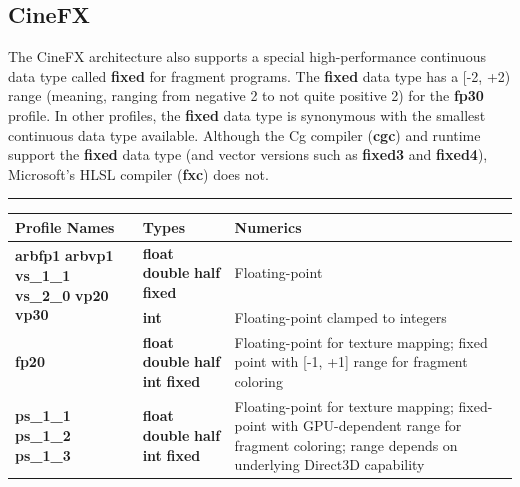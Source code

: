 \documentclass{book}
\begin{document}
\subsection*{CineFX}

The CineFX architecture also supports a special high-performance continuous data type called \textbf{fixed} for fragment programs. The \textbf{fixed} data type has a [-2, +2) range (meaning, ranging from negative 2 to not quite positive 2) for the \textbf{fp30} profile. In other profiles, the \textbf{fixed} data type is synonymous with the smallest continuous data type available. Although the Cg compiler (\textbf{cgc}) and runtime support the \textbf{fixed} data type (and vector versions such as \textbf{fixed3} and \textbf{fixed4}), Microsoft's HLSL compiler (\textbf{fxc}) does not.
\hrule

\begin{table}
\centering
\begin{tabular}{ p{2cm} p{2cm} p{7cm}  } 

Profile Names & Types & Numerics \\
\hline

\multirow{2}{4em}{\textbf{arbfp1} \newline \textbf{arbvp1} \newline \textbf{vs_1_1} \newline \textbf{vs_2_0} \newline \textbf{vp20} \newline \textbf{vp30} } & \textbf{float} \newline \textbf{double} \newline \textbf{half} \newline \textbf{fixed} & Floating-point \\
\cline{2-3}
& \textbf{int} \newline & Floating-point clamped to integers \\
\hline

\textbf{fp20} & \textbf{float} \newline \textbf{double} \newline \textbf{half} \newline \textbf{int} \newline \textbf{fixed} & Floating-point for texture mapping; fixed point with [-1, +1] range for fragment coloring \\
\hline

\textbf{ps_1_1} \newline \textbf{ps_1_2} \newline \textbf{ps_1_3} & \textbf{float} \newline \textbf{double} \newline \textbf{half} \newline \textbf{int} \newline \textbf{fixed} & Floating-point for texture mapping; fixed-point with GPU-dependent range for fragment coloring; range depends on underlying Direct3D capability \\
\hline


\end{tabular}
\end{table}
\end{document}
